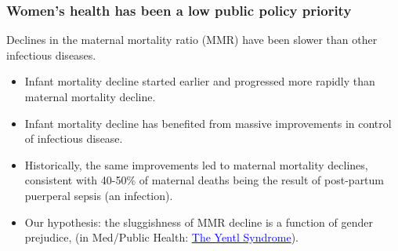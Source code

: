 \documentclass[9pt,letterpaper,subeqn]{beamer}
\begin{document}
\begin{frame}
\frametitle{Women's health has been a low public policy priority}
  Declines in the maternal mortality ratio (MMR) have been slower than other infectious diseases. \vspace{4mm}
\begin{itemize}
  \setlength{\itemsep}{10pt}
	\item Infant mortality decline started earlier and progressed more rapidly 
        than maternal mortality decline.
	\item Infant mortality decline has benefited from massive improvements in 
        control of infectious disease. 
	\item Historically, the same improvements led to maternal mortality declines, 
        consistent with 40-50\% of maternal deaths being the result of post-partum
        puerperal sepsis (an infection).
  \item Our hypothesis: the sluggishness of MMR decline is a function of gender 
        prejudice, (in Med/Public Health: \hyperlink{Yentl}{\textcolor{blue}
        {The Yentl Syndrome}}).
\end{itemize}
\end{frame}
\end{document}
